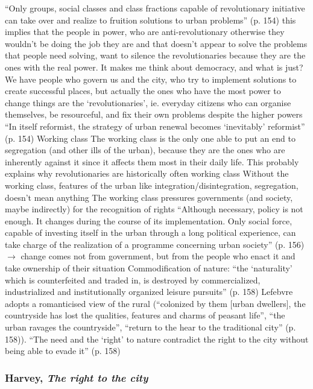 \documentclass{article}
\begin{document}
\begin{outline}
	\1 ``Only groups, social classes and class fractions capable of revolutionary initiative can take over and realize to fruition solutions to urban problems'' (p. 154) this implies that the people in power, who are anti-revolutionary otherwise they wouldn't be doing the job they are and that doesn't appear to solve the problems that people need solving, want to silence the revolutionaries because they are the ones with the real power. It makes me think about democracy, and what is just? We have people who govern us and the city, who try to implement solutions to create successful places, but actually the ones who have the most power to change things are the `revolutionaries', ie. everyday citizens who can organise themselves, be resourceful, and fix their own problems despite the higher powers
	\1 ``In itself reformist, the strategy of urban renewal becomes `inevitably' reformist'' (p. 154)
	\1 Working class
		\2 The working class is the only one able to put an end to segregation (and other ills of the urban), because they are the ones who are inherently against it since it affects them most in their daily life. This probably explains why revolutionaries are historically often working class
		\2 Without the working class, features of the urban like integration/disintegration, segregation, doesn't mean anything
		\2 The working class pressures governments (and society, maybe indirectly) for the recognition of rights 
	\1 ``Although necessary, policy is not enough. It changes during the course of its implementation. Only social force, capable of investing itself in the urban through a long political experience, can take charge of the realization of a programme concerning urban society'' (p. 156) $\rightarrow$ change comes not from government, but from the people who enact it and take ownership of their situation
	\1 Commodification of nature: ``the `naturality' which is counterfeited and traded in, is destroyed by commercialized, industrialized and institutionally organized leisure pursuits'' (p. 158)
	\1 Lefebvre adopts a romanticised view of the rural (``colonized by them [urban dwellers], the countryside has lost the qualities, features and charms of peasant life'', ``the urban ravages the countryside'', ``return to the hear to the traditional city'' (p. 158)). 
	\1 ``The need and the `right' to nature contradict the right to the city without being able to evade it'' (p. 158) 
\end{outline}

\subsubsection{Harvey, \textit{The right to the city}}
\end{document}
